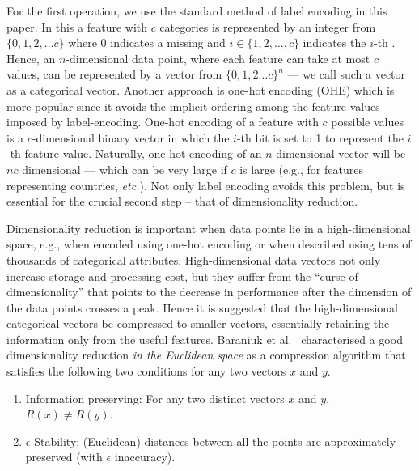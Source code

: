For the first operation, we use the standard method of label encoding in this paper. In this a feature with $c$ categories is represented by an integer from $\{0,1,2,\ldots c\}$ where 0 indicates a missing  and $i \in \{1,2,\ldots, c\}$ indicates the $i$-th . Hence, an $n$-dimensional data point, where each feature can take at most $c$ values, can be represented by a vector from $\{0,1,2\ldots c\}^n$ --- we call such a vector as a categorical vector. Another approach is one-hot encoding (OHE) which is more popular since it avoids the implicit ordering among the feature values imposed by label-encoding. One-hot encoding of a feature with $c$ possible values is a $c$-dimensional binary vector in which the $i$-th bit is set to 1 to represent the $i$-th feature value. Naturally, one-hot encoding of an $n$-dimensional vector will be $nc$ dimensional --- which can be very large if $c$ is large (e.g., for features representing countries, {\it etc.}). Not only label encoding avoids this problem, but is essential for the crucial second step -- that of dimensionality reduction.

Dimensionality reduction is important when data points lie in a high-dimensional space, e.g., when encoded using one-hot encoding or when described using tens of thousands of categorical attributes. High-dimensional data vectors not only increase storage and processing cost, but they suffer from the ``curse of dimensionality'' that points to the decrease in performance after the dimension of the data points crosses a peak. Hence it is suggested that the high-dimensional categorical vectors be compressed to smaller vectors, essentially retaining the information only from the useful features. Baraniuk et al.~\cite{baraniuk2010low} characterised a good dimensionality reduction {\em in the Euclidean space} as a compression algorithm that satisfies the following two conditions for any two vectors $x$ and $y$.

\begin{enumerate}
    \item Information preserving: For any two distinct vectors $x$ and $y$, $R(x) \not= R(y)$.
    \item $\epsilon$-Stability: (Euclidean) distances between all the points are approximately preserved (with $\epsilon$ inaccuracy).
\end{enumerate}

